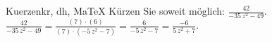 \begin{MAufgabe}{Kuerzen}{kr, dh, MaTeX}
K\"urzen Sie soweit m\"oglich: $\frac{42}{ - 35\, z^2 - 49}$.\\ 
\ifLsg\MLoesung
\quad $\frac{42}{ - 35\, z^2 - 49}=\frac{(7)\cdot(6)}{(7)\cdot( - 5\, z^2 - 7)}=\frac{6}{ - 5\, z^2 - 7}=\frac{-6}{5\, z^2 + 7}$.\else\relax\fi
 \end{MAufgabe}